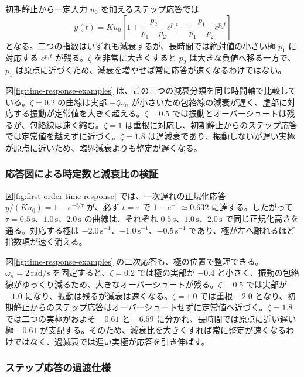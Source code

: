 初期静止から一定入力 $u_0$ を加えるステップ応答では
\begin{equation}
  y(t)=K u_0\left[
    1+\frac{p_2}{p_1-p_2}e^{p_1t}
      -\frac{p_1}{p_1-p_2}e^{p_2t}
  \right]
  \label{eq:second-order-overdamped-step}
\end{equation}
となる。二つの指数はいずれも減衰するが、長時間では絶対値の小さい極 $p_1$ に対応する $e^{p_1t}$ が残る。$\zeta$ を非常に大きくすると $p_2$ は大きな負値へ移る一方で、$p_1$ は原点に近づくため、減衰を増やせば常に応答が速くなるわけではない。

図\ref{fig:time-response-examples} は、この三つの減衰分類を同じ時間軸で比較している。$\zeta=0.2$ の曲線は実部 $-\zeta\omega_n$ が小さいため包絡線の減衰が遅く、虚部に対応する振動が定常値を大きく超える。$\zeta=0.5$ では振動とオーバーシュートは残るが、包絡線は速く縮む。$\zeta=1$ は重根に対応し、初期静止からのステップ応答では定常値を越えずに近づく。$\zeta=1.8$ は過減衰であり、振動しないが遅い実極が原点に近いため、臨界減衰よりも整定が遅くなる。

\subsubsection{応答図による時定数と減衰比の検証}

図\ref{fig:first-order-time-response} では、一次遅れの正規化応答
$y/(Ku_0)=1-e^{-t/\tau}$ が、必ず $t=\tau$ で
$1-e^{-1}\simeq0.632$ に達する。したがって
$\tau=0.5\,\mathrm{s}$、$1.0\,\mathrm{s}$、$2.0\,\mathrm{s}$ の曲線は、それぞれ $0.5\,\mathrm{s}$、$1.0\,\mathrm{s}$、$2.0\,\mathrm{s}$ で同じ正規化高さを通る。対応する極は $-2.0\,\mathrm{s^{-1}}$、$-1.0\,\mathrm{s^{-1}}$、$-0.5\,\mathrm{s^{-1}}$ であり、極が左へ離れるほど指数項が速く消える。

図\ref{fig:time-response-examples} の二次応答も、極の位置で整理できる。$\omega_n=2\,\mathrm{rad/s}$ を固定すると、$\zeta=0.2$ では極の実部が $-0.4$ と小さく、振動の包絡線がゆっくり減るため、大きなオーバーシュートが残る。$\zeta=0.5$ では実部が $-1.0$ になり、振動は残るが減衰は速くなる。$\zeta=1.0$ では重根 $-2.0$ となり、初期静止からのステップ応答はオーバーシュートせずに定常値へ近づく。$\zeta=1.8$ では二つの実極がおよそ $-0.61$ と $-6.59$ に分かれ、長時間では原点に近い遅い極 $-0.61$ が支配する。そのため、減衰比を大きくすれば常に整定が速くなるわけではなく、過減衰では遅い実極が応答を引き伸ばす。

\subsubsection{ステップ応答の過渡仕様}

